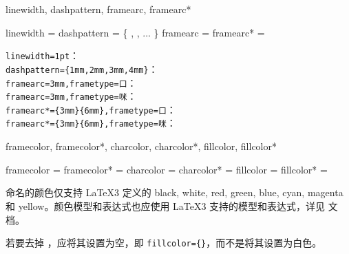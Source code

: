 \documentclass{ctxdoc}
\begin{document}
\begin{function}{
  linewidth,
  dashpattern,
  framearc,
  framearc*
}
  \begin{syntax}
    linewidth   =  \init{0.4pt}
    dashpattern = \{ , , ... \}
    framearc    = 
    framearc*   =  
  \end{syntax}
\end{function}

{
\verb|linewidth=1pt|： \\
\verb|dashpattern={1mm,2mm,3mm,4mm}|： \\
\verb|framearc=3mm,frametype=|\verb|口|： \\
\verb|framearc=3mm,frametype=|\verb|咪|： \\
\verb|framearc*={3mm}{6mm},frametype=|\verb|口|： \\
\verb|framearc*={3mm}{6mm},frametype=|\verb|咪|：
}

\begin{function}{
  framecolor,
  framecolor*,
  charcolor,
  charcolor*,
  fillcolor,
  fillcolor*
}
  \begin{syntax}
    framecolor  =  
    framecolor* =  
    charcolor   =  
    charcolor*  =  
    fillcolor   = 
    fillcolor*  =  
  \end{syntax}
  命名的颜色仅支持 \LaTeX3 定义的 black, white, red, green, blue, cyan, magenta 和 yellow。颜色模型和表达式也应使用 \LaTeX3 支持的模型和表达式，详见 \cite{pdf-interface3} 文档。

  若要去掉 ，应将其设置为空，即 \verb|fillcolor={}|，而不是将其设置为白色。
\end{function}
\end{document}
